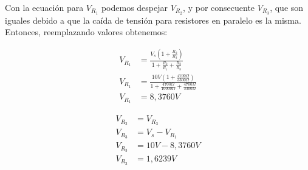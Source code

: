 \documentclass[a4paper,12pt, spanish]{report}
\begin{document}
      Con la ecuación para $V_{R_1}$ podemos despejar $V_{R_2}$, y por consecuente $V_{R_3}$, que son iguales debido a
      que la caída de tensión para resistores en paralelo es la misma. Entonces, reemplazando valores obtenemos:
      \begin{figure}[!h]
        \centering
        \begin{minipage}{0.4\textwidth}
          \begin{align*}
            V_{R_1} &= \frac{V_s \left(1 + \frac{R_2}{R_3}\right)}{1 + \frac{R_2}{R_1} + \frac{R_2}{R_3}}\\
            V_{R_1} &= \frac{10V \left(1 + \frac{4700\Omega}{3300\Omega}\right)}{1 + \frac{4700\Omega}{10000\Omega} + \frac{4700\Omega}{3300\Omega}}\\
            V_{R_1} &= 8,3760V
          \end{align*}
        \end{minipage}
        \centering
        \begin{minipage}{0.4\textwidth}
          \begin{align*}
            V_{R_2} &= V_{R_3}\\
            V_{R_3} &= V_s - V_{R_1}\\
            V_{R_3} &= 10V - 8,3760V\\
            V_{R_3} &= 1,6239V
          \end{align*}
        \end{minipage}
      \end{figure}
\end{document}
